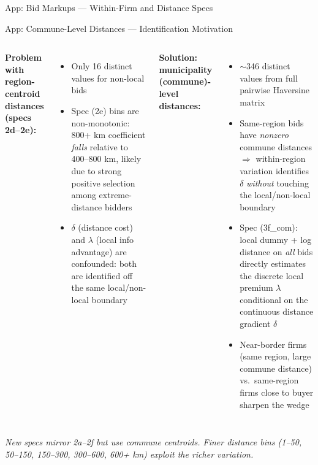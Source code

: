 \documentclass[9pt,aspectratio=169]{beamer}
\begin{document}
\begin{frame}{App: Bid Markups --- Within-Firm and Distance Specs}
\centering
\scriptsize
\resizebox{\linewidth}{!}{%

}
\end{frame}

\begin{frame}{App: Commune-Level Distances --- Identification Motivation}
\begin{columns}[T]
  \textbf{Problem with region-centroid distances (specs 2d–2e):}
  \begin{itemize}
    \item Only 16 distinct values for non-local bids
    \item Spec (2e) bins are non-monotonic: 800+ km coefficient
          \emph{falls} relative to 400--800 km, likely due to strong
          positive selection among extreme-distance bidders
    \item $\delta$ (distance cost) and $\lambda$ (local info advantage)
          are confounded: both are identified off the same
          local/non-local boundary
  \end{itemize}

  \textbf{Solution: municipality (commune)-level distances:}
  \begin{itemize}
    \item $\sim$346 distinct values from full pairwise Haversine matrix
    \item Same-region bids have \emph{nonzero} commune distances
          $\Rightarrow$ within-region variation identifies $\delta$
          \emph{without} touching the local/non-local boundary
    \item Spec (3f\_com): local dummy + log distance on \emph{all} bids
          directly estimates the discrete local premium $\lambda$
          conditional on the continuous distance gradient $\delta$
    \item Near-border firms (same region, large commune distance)
          vs.\ same-region firms close to buyer sharpen the wedge
  \end{itemize}
\end{columns}

\medskip
\centering\small
\textit{New specs mirror 2a--2f but use commune centroids.
        Finer distance bins (1--50, 50--150, 150--300, 300--600, 600+ km)
        exploit the richer variation.}
\end{frame}
\end{document}
